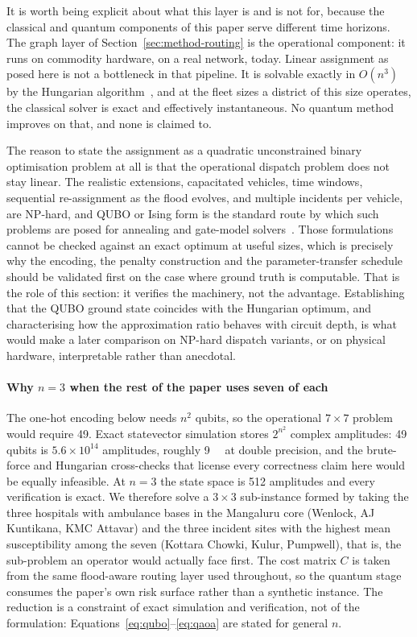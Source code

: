 \documentclass[journal]{IEEEtran}
\begin{document}
It is worth being explicit about what this layer is and is not for, because the
classical and quantum components of this paper serve different time horizons. The
graph layer of Section~\ref{sec:method-routing} is the operational component: it
runs on commodity hardware, on a real network, today. Linear assignment as posed
here is not a bottleneck in that pipeline. It is solvable exactly in $O(n^3)$ by
the Hungarian algorithm~\citep{kuhn1955}, and at the fleet sizes a district of
this size operates, the classical solver is exact and effectively instantaneous.
No quantum method improves on that, and none is claimed to.

The reason to state the assignment as a quadratic unconstrained binary
optimisation problem at all is that the operational dispatch problem does not stay
linear. The realistic extensions, capacitated vehicles, time windows, sequential
re-assignment as the flood evolves, and multiple incidents per vehicle, are
NP-hard, and QUBO or Ising form is the standard route by which such problems are
posed for annealing and gate-model
solvers~\citep{lucas2014,glover2019,fitzek2024}. Those formulations cannot be
checked against an exact optimum at useful sizes, which is precisely why the
encoding, the penalty construction and the parameter-transfer schedule should be
validated first on the case where ground truth is computable. That is the role of
this section: it verifies the machinery, not the advantage. Establishing that the
QUBO ground state coincides with the Hungarian optimum, and characterising how
the approximation ratio behaves with circuit depth, is what would make a later
comparison on NP-hard dispatch variants, or on physical hardware, interpretable
rather than anecdotal.

\paragraph{Why $n=3$ when the rest of the paper uses seven of each}
The one-hot encoding below needs $n^2$ qubits, so the operational $7\times7$
problem would require 49. Exact statevector simulation stores $2^{n^2}$ complex
amplitudes: 49 qubits is $5.6\times10^{14}$ amplitudes, roughly \SI{9}{\peta\byte}
at double precision, and the brute-force and Hungarian cross-checks that license
every correctness claim here would be equally infeasible. At $n=3$ the state
space is 512 amplitudes and every verification is exact. We therefore solve a
$3\times3$ sub-instance formed by taking the three hospitals with ambulance
bases in the Mangaluru core (Wenlock, AJ Kuntikana, KMC Attavar) and the three
incident sites with the highest mean susceptibility among the seven (Kottara
Chowki, Kulur, Pumpwell), that is, the sub-problem an operator would actually
face first. The cost matrix $C$ is taken from the same flood-aware routing layer
used throughout, so the quantum stage consumes the paper's own risk surface
rather than a synthetic instance. The reduction is a constraint of exact
simulation and verification, not of the formulation:
Equations~\eqref{eq:qubo}--\eqref{eq:qaoa} are stated for general $n$.
\end{document}
